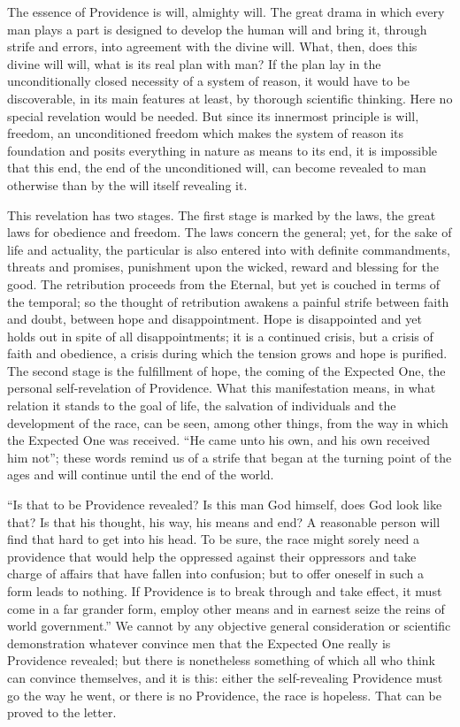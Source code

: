 \documentclass[12pt,a4paper,openany]{book}
\newcommand{\opage}[1]{\marginnote{\footnotesize\textit{[#1]}}}
\begin{document}
The essence of Providence is will, almighty will. The great drama in which every man plays a part is designed to
develop the human will and bring it, through strife and errors, into agreement with the divine will. What, then, does
this divine will will, what is its real plan with man? If the plan lay in the unconditionally closed necessity of a
system of reason, it would have to be discoverable, in its main features at least, by thorough scientific thinking.
Here no special revelation would be needed. But since its innermost principle is will, freedom, an unconditioned
freedom which makes the system of reason its foundation and posits everything in nature as means to its end, it is
impossible that this end, the end of the unconditioned will, can become revealed to man otherwise than by the will
itself revealing it.

This revelation has two stages. The first stage is marked by the laws, the great laws for obedience and freedom. The
laws concern the general; yet, for the sake of life and actuality, the particular is also entered into with definite
commandments, threats and promises,
\setcounter{footnote}{0}%
\opage{62}punishment upon the wicked, reward and blessing for the good. The retribution proceeds from the Eternal, but
yet is couched in terms of the temporal; so the thought of retribution awakens a painful strife between faith and
doubt, between hope and disappointment. Hope is disappointed and yet holds out in spite of all disappointments; it is a
continued crisis, but a crisis of faith and obedience, a crisis during which the tension grows and hope is purified.
The second stage is the fulfillment of hope, the coming of the Expected One, the personal self-revelation of
Providence. What this manifestation means, in what relation it stands to the goal of life, the salvation of
individuals and the development of the race, can be seen, among other things, from the way in which the Expected One
was received. ``He came unto his own, and his own received him not''; these words remind us of a strife that began at
the turning point of the ages and will continue until the end of the world.

``Is that to be Providence revealed? Is this man God himself, does God look like that? Is that his thought, his way,
his means and end? A reasonable person will find that hard to get into his head. To be sure, the race might sorely
need a providence that would help the oppressed against their oppressors and take charge of affairs that have fallen
into confusion; but to offer oneself in such a form leads to nothing. If Providence is to break through and take
effect, it must come in a far grander form, employ other means and in earnest seize the reins of world government.''
We cannot by any objective general consideration or scientific demonstration whatever convince men that the Expected
One really is Providence revealed; but there is nonetheless something of which all who think can
\setcounter{footnote}{0}%
\opage{63}convince themselves, and it is this: either the self-revealing Providence must go the way he went, or there
is no Providence, the race is hopeless. That can be proved to the letter.
\end{document}
